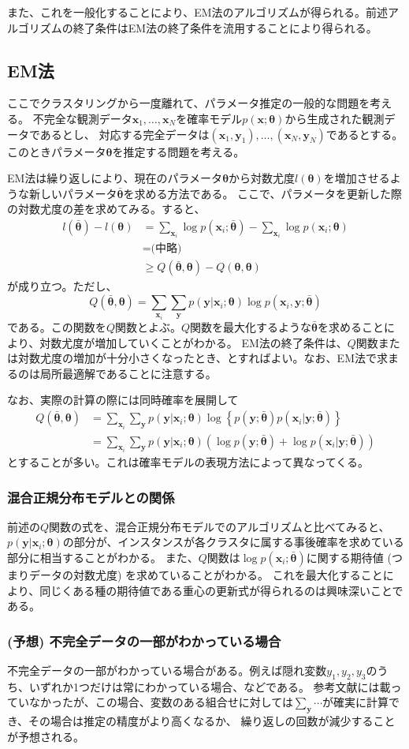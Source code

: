 \documentclass[9pt,draft,twocolumn]{jsarticle}
\newcommand{\bmx}{{\bm{x}}}
\newcommand{\bmy}{{\bm{y}}}
\newcommand{\bmt}{{\bm\theta}}
\newcommand{\bmtb}{\bar\bmt}
\newcommand{\dsum}{\displaystyle\sum}
\begin{document}
また、これを一般化することにより、EM法のアルゴリズムが得られる。前述アルゴリズムの終了条件はEM法の終了条件を流用することにより得られる。

\subsection{EM法}
ここでクラスタリングから一度離れて、パラメータ推定の一般的な問題を考える。
不完全な観測データ$\bm{x}_1,\ldots,\bm{x}_N$を確率モデル$p(\bm
x;\bm\theta)$から生成された観測データであるとし、 対応する完全データは$(\bm{x}_1,\bm{y}_1),\ldots,(\bm{x}_N,\bm{y}_N)$であるとする。
このときパラメータ$\bm{\theta}$を推定する問題を考える。

EM法は繰り返しにより、現在のパラメータ$\bm\theta$から対数尤度$l(\bm\theta)$を増加させるような新しいパラメータ$\bar{\bm\theta}$を求める方法である。
ここで、パラメータを更新した際の対数尤度の差を求めてみる。すると、
\[
\begin{split}
l(\bar{\bm\theta}) - l(\bm\theta) &= \sum_{\bm{x}_i} \log p(\bm x_i;\bmtb)
	- \sum_{\bm x_i} \log p(\bm x_i;\bmt) \\
	&= \text{(中略)} \\
	&\ge Q(\bmtb,\bmt) -Q(\bmt,\bmt)
\end{split}
\]
が成り立つ。ただし、
\[ Q(\bmtb,\bmt) = \sum_{\bm x_i} \sum_\bmy p(\bmy | \bmx_i ;\bmt) \log p(\bmx_i,\bmy;\bmtb) \]
である。この関数を$Q$関数とよぶ。$Q$関数を最大化するような$\bmtb$を求めることにより、対数尤度が増加していくことがわかる。
EM法の終了条件は、$Q$関数または対数尤度の増加が十分小さくなったとき、とすればよい。なお、EM法で求まるのは局所最適解であることに注意する。

なお、実際の計算の際には同時確率を展開して
\[
\begin{split}
Q(\bmtb,\bmt) &= \sum_{\bm x_i} \sum_\bmy p(\bmy | \bmx_i ;\bmt) 
	\log \left\{ p(\bmy;\bmtb) p(\bmx_i|\bmy;\bmtb) \right\} \\
&= \sum_{\bm x_i} \sum_\bmy p(\bmy | \bmx_i ;\bmt) 
	( \log p(\bmy;\bmtb) + \log p(\bmx_i|\bmy;\bmtb) )
\end{split} 
\]
とすることが多い。これは確率モデルの表現方法によって異なってくる。

\subsubsection{混合正規分布モデルとの関係}
前述の$Q$関数の式を、混合正規分布モデルでのアルゴリズムと比べてみると、$p(\bmy | \bmx_i
;\bmt)$の部分が、インスタンスが各クラスタに属する事後確率を求めている部分に相当することがわかる。
また、$Q$関数は$\log p(\bmx_i;\bmtb)$に関する期待値 (つまりデータの対数尤度) を求めていることがわかる。
これを最大化することにより、同じくある種の期待値である重心の更新式が得られるのは興味深いことである。

\subsubsection{(予想) 不完全データの一部がわかっている場合}
不完全データの一部がわかっている場合がある。例えば隠れ変数$y_1,y_2,y_3$のうち、いずれか1つだけは常にわかっている場合、などである。
参考文献には載っていなかったが、この場合、変数のある組合せに対しては$\dsum_\bmy\cdots$が確実に計算でき、その場合は推定の精度がより高くなるか、
繰り返しの回数が減少することが予想される。



\end{document}
